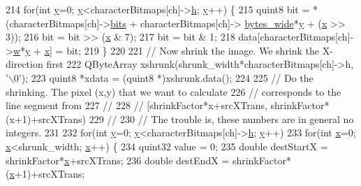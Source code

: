 \begin{DoxyCode}
{214       \textcolor{keywordflow}{for}(\textcolor{keywordtype}{int} \hyperlink{classglyph_ac9b8f10a7be77024f34c723eeea34bf3}{y}=0; \hyperlink{classglyph_ac9b8f10a7be77024f34c723eeea34bf3}{y}<characterBitmaps[ch]->\hyperlink{structbitmap_a34f28c8404007de8ede4b9a6b5e425dd}{h}; \hyperlink{classglyph_ac9b8f10a7be77024f34c723eeea34bf3}{y}++) \{
215         quint8 bit = *(characterBitmaps[ch]->\hyperlink{structbitmap_a5d74448ece4936321ffd2bdc4fabe445}{bits} + characterBitmaps[ch]->
      \hyperlink{structbitmap_ae248def3f3413e79d52541195017a32c}{bytes\_wide}*\hyperlink{classglyph_ac9b8f10a7be77024f34c723eeea34bf3}{y} + (\hyperlink{classglyph_aa030c1619dd07d04f843c5ee9a54dde1}{x} >> 3));
216         bit = bit >> (\hyperlink{classglyph_aa030c1619dd07d04f843c5ee9a54dde1}{x} & 7);
217         bit = bit & 1;
218         data[characterBitmaps[ch]->\hyperlink{structbitmap_a955acbe13f247a259cbe10ced3a212fd}{w}*\hyperlink{classglyph_ac9b8f10a7be77024f34c723eeea34bf3}{y} + \hyperlink{classglyph_aa030c1619dd07d04f843c5ee9a54dde1}{x}] = bit;
219       \}
220 
221     \textcolor{comment}{// Now shrink the image. We shrink the X-direction first}
222     QByteArray xshrunk(shrunk\_width*characterBitmaps[ch]->h, \textcolor{charliteral}{'\(\backslash\)0'});
223     quint8 *xdata = (quint8 *)xshrunk.data();
224 
225     \textcolor{comment}{// Do the shrinking. The pixel (x,y) that we want to calculate}
226     \textcolor{comment}{// corresponds to the line segment from}
227     \textcolor{comment}{//}
228     \textcolor{comment}{// [shrinkFactor*x+srcXTrans, shrinkFactor*(x+1)+srcXTrans)}
229     \textcolor{comment}{//}
230     \textcolor{comment}{// The trouble is, these numbers are in general no integers.}
231 
232     \textcolor{keywordflow}{for}(\textcolor{keywordtype}{int} \hyperlink{classglyph_ac9b8f10a7be77024f34c723eeea34bf3}{y}=0; \hyperlink{classglyph_ac9b8f10a7be77024f34c723eeea34bf3}{y}<characterBitmaps[ch]->\hyperlink{structbitmap_a34f28c8404007de8ede4b9a6b5e425dd}{h}; \hyperlink{classglyph_ac9b8f10a7be77024f34c723eeea34bf3}{y}++)
233       \textcolor{keywordflow}{for}(\textcolor{keywordtype}{int} \hyperlink{classglyph_aa030c1619dd07d04f843c5ee9a54dde1}{x}=0; \hyperlink{classglyph_aa030c1619dd07d04f843c5ee9a54dde1}{x}<shrunk\_width; \hyperlink{classglyph_aa030c1619dd07d04f843c5ee9a54dde1}{x}++) \{
234         quint32 value = 0;
235         \textcolor{keywordtype}{double} destStartX = shrinkFactor*\hyperlink{classglyph_aa030c1619dd07d04f843c5ee9a54dde1}{x}+srcXTrans;
236         \textcolor{keywordtype}{double} destEndX   = shrinkFactor*(\hyperlink{classglyph_aa030c1619dd07d04f843c5ee9a54dde1}{x}+1)+srcXTrans;
}
\end{DoxyCode}
